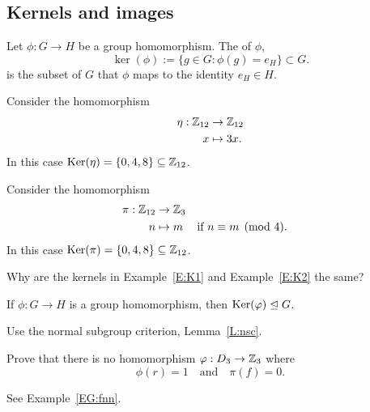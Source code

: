 \documentclass{ximera}
\begin{document}
\subsection{Kernels and images}


\begin{definition}
  Let $\phi:G\to H$ be a group homomorphism. The  of
  $\phi$,
  \[
  \ker(\phi) := \{g\in G: \phi(g) = e_H\}\subset G.
  \]
  is the subset of $G$ that $\phi$ maps to the identity $e_H\in H$.
\end{definition}

\begin{example}\label{E:K1}
  Consider the homomorphism
  \begin{align*}
    \eta:\mathbb Z_{12} &\to \mathbb Z_{12}\\
    x &\mapsto 3x.
  \end{align*}
  In this case $\mathop{\mathrm{Ker}}\nolimits(\eta) = \{0,4,8\}\subseteq \mathbb Z_{12}$.
\end{example}

\begin{example}\label{E:K2} 
  Consider the homomorphism
  \begin{align*}
    \pi:\mathbb Z_{12} &\to \mathbb Z_{3}\\
    n &\mapsto m & &\text{if $n\equiv m \pmod{4}$}.
  \end{align*}
  In this case $\mathop{\mathrm{Ker}}\nolimits(\pi) = \{0,4,8\}\subseteq \mathbb Z_{12}$.
\end{example}

\begin{exercise}
  Why are the kernels in Example~\ref{E:K1} and Example~\ref{E:K2} the
  same?
\end{exercise}



\begin{lemma}\label{L:kerN}
  If $\phi:G\to H$ is a group homomorphism, then $\mathop{\mathrm{Ker}}\nolimits(\varphi)\trianglelefteq G$.
  \begin{sketch}
    Use the normal subgroup criterion, Lemma~\ref{L:nsc}.
  \end{sketch}
\end{lemma}

\begin{exercise}
  Prove that there is no homomorphism $\varphi:D_3\to \mathbb Z_3$ where
  \[
  \phi(r) = 1\quad\text{and}\quad\pi(f) = 0. 
  \]
  \begin{hint}
    See Example~\ref{EG:fnn}.
  \end{hint}
\end{exercise}
\end{document}
